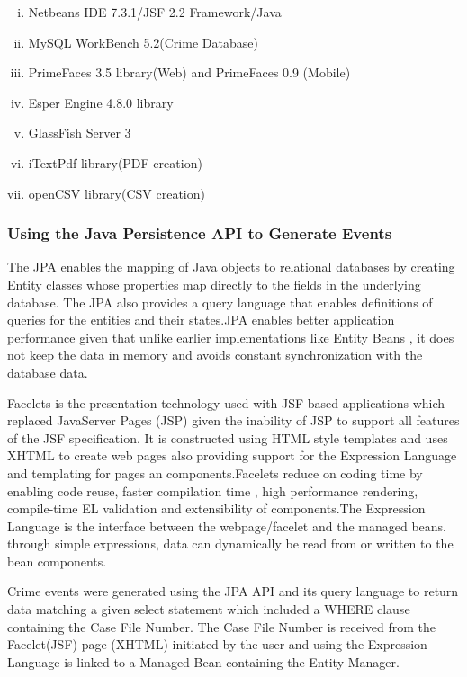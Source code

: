 \begin{enumerate}[(i)]
\item Netbeans IDE 7.3.1/JSF 2.2 Framework/Java
\item MySQL WorkBench 5.2(Crime Database)
\item PrimeFaces 3.5 library(Web) and PrimeFaces 0.9 (Mobile)
\item Esper Engine 4.8.0 library
\item GlassFish Server 3
\item iTextPdf library(PDF creation)
\item openCSV library(CSV creation)
 

 \end{enumerate}


\subsubsection{Using the Java Persistence API  to Generate Events}

\noindent The JPA \cite{twentythree} enables the mapping of Java objects to relational databases by creating Entity classes whose properties map directly to the fields in the underlying database. The JPA also provides a query language that  enables definitions of queries for the entities and their states.JPA enables better application performance given that unlike earlier implementations like Entity Beans , it does not  keep the data in memory and avoids constant synchronization with the database data.

\noindent Facelets \cite{twentythree} is the presentation technology used with JSF based applications which replaced JavaServer Pages (JSP) given the inability of JSP to  support all features of the JSF specification. It is  constructed using HTML style templates and uses XHTML to create web pages also providing support for the Expression Language and templating for pages an components.Facelets reduce on coding time by enabling code reuse, faster compilation time , high performance rendering, compile-time EL validation and extensibility of components.The Expression Language is the interface between the webpage/facelet and the managed beans. through simple expressions, data can dynamically be read from or written to the bean components.

\noindent Crime events were generated using the JPA API  and its query language to return data matching a given select statement which included a WHERE clause containing the Case File Number. The Case File Number is received from the Facelet(JSF) page (XHTML) initiated by the user and using the Expression Language \cite{twentythree} is linked to a Managed Bean \cite{twentythree} containing the Entity Manager. 

